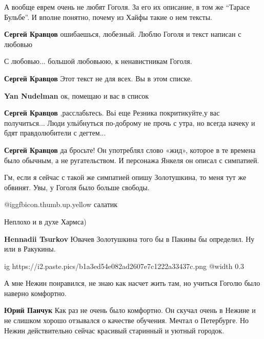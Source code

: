 \begin{itemize}
\begin{itemize}
\end{itemize} %


А вообще еврем очень не любят Гоголя. За его их описание, в том же \enquote{Тарасе
Бульбе}. И вполне понятно, почему из Хайфы такие о нем тексты.

\begin{itemize} %
\textbf{Сергей Кравцов} ошибаешься, любезный. Люблю Гоголя и текст написан с любовью

С любовью... большой любовьюю, к ненавистникам Гоголя.

\textbf{Сергей Кравцов} Этот текст не для всех. Вы в этом списке.

\textbf{Yan Nudelman} ок, помещаю и вас в список

\textbf{Сергей Кравцов} ,расслабьтесь. Вьі еще Резника покритикуйте,у вас получиться... Люди ульібнуться по-доброму не прочь с утра, но всегда начеку и бдят правдолюбители с дегтем...

\textbf{Сергей Кравцов} да бросьте! Он употреблял слово «жид», которое в те времена было обычным, а не ругательством. И персонажа Янкеля он описал с симпатией.

Гм, если я сейчас с такой же симпатией опишу Золотушкина, то меня тут же обвинят. Увы, у Гоголя было больше свободы.
\end{itemize} %

 @igg{fbicon.thumb.up.yellow} салатик

Неплохо и в духе Хармса)

\textbf{Hennadii Tsurkov} Ювачев Золотушкина того бы в Пакины бы определил. Ну или в Ракукины.


\ifcmt
  ig https://i2.paste.pics/b1a3ed54e082ad2607e7c1222a33437c.png
  @width 0.3
\fi


А мне Нежин понравился, не знаю как насчет жить там, но учиться Гоголю было
наверно комфортно.

\begin{itemize} %
\textbf{Юрий Панчук} Как раз не очень было комфортно. Он скучал очень в Нежине и не слишком хорошо отзывался о качестве обучения. Мечтал о Петербурге. Но Нежин действительно сейчас красивый старинный и уютный городок.
\end{itemize} %


\end{itemize}
